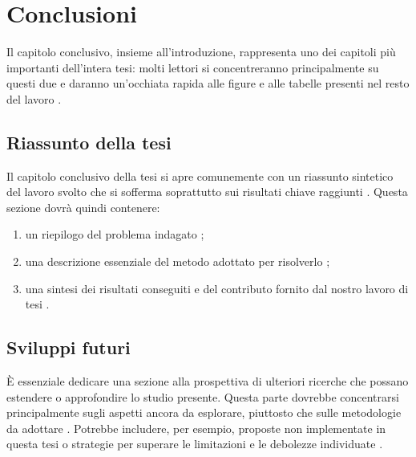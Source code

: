 \chapter{Conclusioni}
\label{chap:conclusioni}

\acresetall

Il capitolo conclusivo, insieme all'introduzione, rappresenta uno dei capitoli più importanti dell'intera tesi: molti lettori si concentreranno principalmente su questi due e daranno un'occhiata rapida alle figure e alle tabelle presenti nel resto del lavoro \cite{tuni2019guide}.

\section{Riassunto della tesi}

Il capitolo conclusivo della tesi si apre comunemente con un riassunto sintetico del lavoro svolto che si sofferma soprattutto sui risultati chiave raggiunti \cite{fau2023thesis}. Questa sezione dovrà quindi contenere:
\begin{enumerate}

\item un riepilogo del problema indagato \cite{pfandzelter2022thesis};

\item una descrizione essenziale del metodo adottato per risolverlo \cite{pfandzelter2022thesis};

\item una sintesi dei risultati conseguiti \cite{zobel2015writing} e del contributo fornito dal nostro lavoro di tesi \cite{aceto2023paper}.

\end{enumerate}

\section{Sviluppi futuri}

È essenziale dedicare una sezione alla prospettiva di ulteriori ricerche che possano estendere o approfondire lo studio presente. Questa parte dovrebbe concentrarsi principalmente sugli aspetti ancora da esplorare, piuttosto che sulle metodologie da adottare \cite{fau2023thesis}. Potrebbe includere, per esempio, proposte non implementate in questa tesi o strategie per superare le limitazioni e le debolezze individuate \cite{pfandzelter2022thesis}.